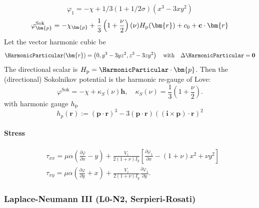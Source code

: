 \begin{equation}
\varphi_1=-\chi+1 / 3(1+1 / 2 \sigma)\left(x^3-3 x y^2\right)
\end{equation}
\begin{equation*}
\varphi_{\bm{p}}^{\text {Sok }}=-\chi_{\bm{p}}+\frac{1}{3}\left(1+\frac{\nu}{2}\right)(\nu) H_{\rm{p}}(\bm{r})+c_0+\mathbf{c} \cdot \bm{r}
\end{equation*}
Let the vector harmonic cubic be
$$
\HarmonicParticular(\bm{r})=\left(0, y^3-3 y z^2, z^3-3 z y^2\right)
\quad\text{with}\quad 
\Delta \HarmonicParticular=\mathbf{0}
$$
The directional scalar is $H_{\mathrm{p}}=\HarmonicParticular \cdot \bm{p}$.
Then the (directional) Sokolnikov potential is the harmonic re-gauge of Love:
$$
\varphi^{\mathrm{Sok}}=-\chi+\kappa_S(\nu) \mathbf{h}, \quad \kappa_S(\nu)=\frac{1}{3}\left(1+\frac{\nu}{2}\right) .
$$
with harmonic gauge \(h_{\rm p}\)
\begin{equation*}
h_{p}(\bm{r}):=(\bm{p} \cdot \bm{r})^3-3(\bm{p} \cdot \bm{r})\left((\mathbf{i}\times\bm{p}) \cdot \bm{r}\right)^2
\end{equation*}
\paragraph{Stress}
$$
\begin{aligned} & \tau_{x x}=\mu \alpha\left(\frac{\partial \varphi}{\partial x}-y\right)+\frac{V_z}{2(1+\nu) I_y}\left[\frac{\partial \varphi_1}{\partial x}-(1+\nu) x^2+\nu y^2\right] \\ & \tau_{x y}=\mu \alpha\left(\frac{\partial \varphi}{\partial y}+x\right)+\frac{V_z}{2(1+\nu) I_y} \frac{\partial \varphi_1}{\partial y} .\end{aligned}
$$

\subsubsection{Laplace-Neumann III (L0-N2, Serpieri-Rosati)}

